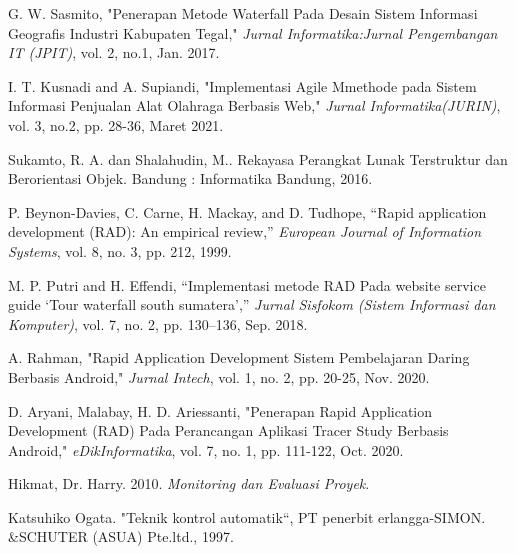 \begin{thebibliography}{7}
G. W.  Sasmito, "Penerapan Metode Waterfall Pada Desain Sistem Informasi Geografis Industri Kabupaten Tegal," \emph{Jurnal Informatika:Jurnal Pengembangan IT (JPIT)}, vol. 2, no.1, Jan. 2017.

I. T.  Kusnadi and A.  Supiandi, "Implementasi Agile Mmethode pada Sistem Informasi Penjualan Alat Olahraga Berbasis Web," \emph{Jurnal Informatika(JURIN)}, vol. 3, no.2, pp. 28-36, Maret 2021. 

Sukamto, R. A. dan Shalahudin, M.. Rekayasa Perangkat Lunak Terstruktur dan Berorientasi Objek. Bandung : Informatika Bandung, 2016.

P. Beynon-Davies, C. Carne, H. Mackay, and D. Tudhope, “Rapid application development (RAD): An empirical review,” \emph{European Journal of Information Systems}, vol. 8, no. 3, pp. 212, 1999. 

M. P. Putri and H. Effendi, “Implementasi metode RAD Pada website  service guide ‘Tour waterfall south sumatera’,” \emph{Jurnal Sisfokom (Sistem Informasi dan Komputer)}, vol. 7, no. 2, pp. 130–136, Sep. 2018. 

A. Rahman, "Rapid Application Development Sistem Pembelajaran Daring Berbasis Android," \emph{Jurnal Intech}, vol. 1, no. 2, pp. 20-25, Nov. 2020.

D. Aryani, Malabay, H. D. Ariessanti, "Penerapan Rapid Application Development (RAD) Pada Perancangan Aplikasi Tracer Study Berbasis Android," \emph{eDikInformatika}, vol. 7, no. 1, pp. 111-122, Oct. 2020.

Hikmat, Dr. Harry. 2010. \emph{Monitoring dan Evaluasi Proyek}.

Katsuhiko Ogata. "Teknik kontrol automatik“, PT penerbit erlangga-SIMON. \&SCHUTER (ASUA) Pte.ltd., 1997.


\end{thebibliography}
